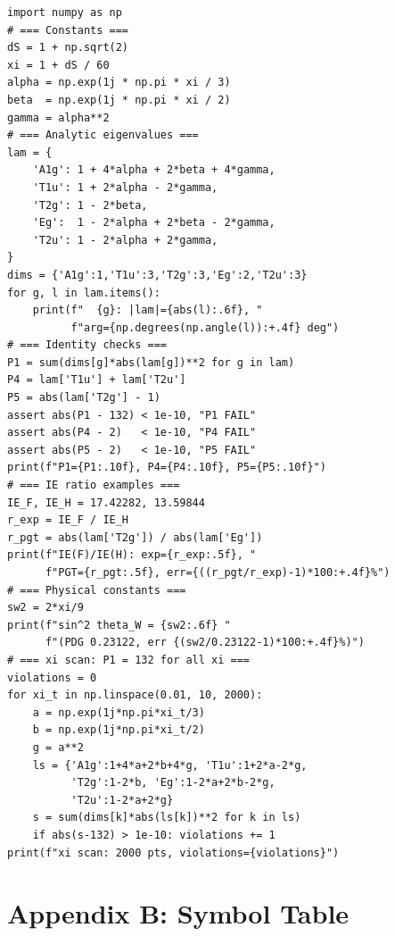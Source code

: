 \documentclass[11pt,a4paper]{article}
\begin{document}
{\small
\begin{verbatim}
import numpy as np
# === Constants ===
dS = 1 + np.sqrt(2)
xi = 1 + dS / 60
alpha = np.exp(1j * np.pi * xi / 3)
beta  = np.exp(1j * np.pi * xi / 2)
gamma = alpha**2
# === Analytic eigenvalues ===
lam = {
    'A1g': 1 + 4*alpha + 2*beta + 4*gamma,
    'T1u': 1 + 2*alpha - 2*gamma,
    'T2g': 1 - 2*beta,
    'Eg':  1 - 2*alpha + 2*beta - 2*gamma,
    'T2u': 1 - 2*alpha + 2*gamma,
}
dims = {'A1g':1,'T1u':3,'T2g':3,'Eg':2,'T2u':3}
for g, l in lam.items():
    print(f"  {g}: |lam|={abs(l):.6f}, "
          f"arg={np.degrees(np.angle(l)):+.4f} deg")
# === Identity checks ===
P1 = sum(dims[g]*abs(lam[g])**2 for g in lam)
P4 = lam['T1u'] + lam['T2u']
P5 = abs(lam['T2g'] - 1)
assert abs(P1 - 132) < 1e-10, "P1 FAIL"
assert abs(P4 - 2)   < 1e-10, "P4 FAIL"
assert abs(P5 - 2)   < 1e-10, "P5 FAIL"
print(f"P1={P1:.10f}, P4={P4:.10f}, P5={P5:.10f}")
# === IE ratio examples ===
IE_F, IE_H = 17.42282, 13.59844
r_exp = IE_F / IE_H
r_pgt = abs(lam['T2g']) / abs(lam['Eg'])
print(f"IE(F)/IE(H): exp={r_exp:.5f}, "
      f"PGT={r_pgt:.5f}, err={((r_pgt/r_exp)-1)*100:+.4f}%")
# === Physical constants ===
sw2 = 2*xi/9
print(f"sin^2 theta_W = {sw2:.6f} "
      f"(PDG 0.23122, err {(sw2/0.23122-1)*100:+.4f}%)")
# === xi scan: P1 = 132 for all xi ===
violations = 0
for xi_t in np.linspace(0.01, 10, 2000):
    a = np.exp(1j*np.pi*xi_t/3)
    b = np.exp(1j*np.pi*xi_t/2)
    g = a**2
    ls = {'A1g':1+4*a+2*b+4*g, 'T1u':1+2*a-2*g,
          'T2g':1-2*b, 'Eg':1-2*a+2*b-2*g,
          'T2u':1-2*a+2*g}
    s = sum(dims[k]*abs(ls[k])**2 for k in ls)
    if abs(s-132) > 1e-10: violations += 1
print(f"xi scan: 2000 pts, violations={violations}")
\end{verbatim}
}

\section{Appendix B: Symbol Table}\label{app:symbols}
\end{document}
